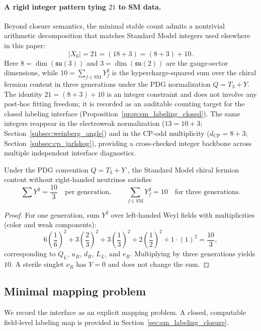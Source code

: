 \paragraph{A rigid integer pattern tying $21$ to SM data.}
Beyond closure semantics, the minimal stable count admits a nontrivial arithmetic decomposition that matches Standard Model integers used elsewhere in this paper:
\[
|X_6|=21=(18+3)=(8+3)+10.
\]
Here $8=\dim(\mathfrak{su}(3))$ and $3=\dim(\mathfrak{su}(2))$ are the gauge-sector dimensions, while $10=\sum_{f\in\mathrm{SM}}Y_f^2$ is the hypercharge-squared sum over the chiral fermion content in three generations under the PDG normalization $Q=T_3+Y$.
The identity $21=(8+3)+10$ is an integer constraint and does not involve any post-hoc fitting freedom; it is recorded as an auditable counting target for the closed labeling interface (Proposition~\ref{prop:sm_labeling_closed}).
The same integers reappear in the electroweak normalization ($13=10+3$; Section~\ref{subsec:weinberg_angle}) and in the CP-odd multiplicity ($d_{\mathrm{CP}}=8+3$; Section~\ref{subsec:cp_jarlskog}), providing a cross-checked integer backbone across multiple independent interface diagnostics.

\begin{lemma}\label{lem:hypercharge_sum_10}
Under the PDG convention $Q=T_3+Y$ \cite{PDGRPP2024}, the Standard Model chiral fermion content without right-handed neutrinos satisfies
\[
\sum Y^2=\frac{10}{3}\quad\text{per generation},
\qquad
\sum_{f\in\mathrm{SM}}Y_f^2=10\quad\text{for three generations}.
\]
\end{lemma}
\begin{proof}
For one generation, sum $Y^2$ over left-handed Weyl fields with multiplicities (color and weak components):
\[
6\left(\frac{1}{6}\right)^2
 +3\left(\frac{2}{3}\right)^2
 +3\left(\frac{1}{3}\right)^2
 +2\left(\frac{1}{2}\right)^2
 +1\cdot (1)^2
=\frac{10}{3},
\]
corresponding to $Q_L$, $u_R$, $d_R$, $L_L$, and $e_R$.
Multiplying by three generations yields $10$.
A sterile singlet $\nu_R$ has $Y=0$ and does not change the sum.
\end{proof}

\subsection{Minimal mapping problem}
\label{subsec:min_mapping_problem}

We record the interface as an explicit mapping problem.
A closed, computable field-level labeling map is provided in Section~\ref{sec:sm_labeling_closure}.
